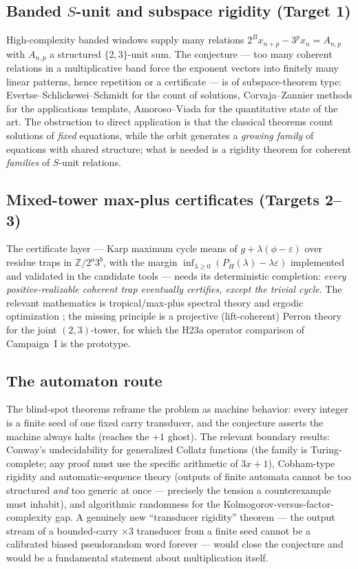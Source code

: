 \documentclass[11pt]{article}
\newcommand{\Z}{\mathbb Z}
\begin{document}
\subsection{Banded $S$-unit and subspace rigidity (Target 1)}
High-complexity banded windows supply many relations
$2^{B}x_{n+p}-3^px_n=A_{n,p}$ with $A_{n,p}$ a structured
$\{2,3\}$-unit sum.  The conjecture --- too many coherent relations in
a multiplicative band force the exponent vectors into finitely many
linear patterns, hence repetition or a certificate --- is of
subspace-theorem type: Evertse--Schlickewei--Schmidt \cite{ESS} for
the count of solutions, Corvaja--Zannier methods \cite{CZ} for the
applications template, Amoroso--Viada \cite{AV} for the quantitative
state of the art.  The obstruction to direct application is that the
classical theorems count solutions of \emph{fixed} equations, while
the orbit generates a \emph{growing family} of equations with shared
structure; what is needed is a rigidity theorem for coherent
\emph{families} of $S$-unit relations.

\subsection{Mixed-tower max-plus certificates (Targets 2--3)}
The certificate layer --- Karp maximum cycle means of
$g+\lambda(\phi-\varepsilon)$ over residue traps in $\Z/2^a3^b$, with
the margin $\inf_{\lambda\ge0}(P_H(\lambda)-\lambda\varepsilon)$
implemented and validated in the candidate tools --- needs its
deterministic completion: \emph{every positive-realizable coherent
trap eventually certifies, except the trivial cycle}.  The relevant
mathematics is tropical/max-plus spectral theory \cite{Butkovic} and
ergodic optimization \cite{Jenkinson}; the missing principle is a
projective (lift-coherent) Perron theory for the joint
$(2,3)$-tower, for which the H23a operator comparison of Campaign~I
is the prototype.

\subsection{The automaton route}
The blind-spot theorems reframe the problem as machine behavior:
every integer is a finite seed of one fixed carry transducer, and the
conjecture asserts the machine always halts (reaches the $+1$ ghost).
The relevant boundary results: Conway's undecidability for
generalized Collatz functions \cite{Conway,KurtzSimon} (the family is
Turing-complete; any proof must use the specific arithmetic of
$3x+1$), Cobham-type rigidity and automatic-sequence theory
\cite{Allouche,AdamczewskiBugeaud} (outputs of finite automata cannot
be too structured \emph{and} too generic at once --- precisely the
tension a counterexample must inhabit), and algorithmic randomness
\cite{DowneyHirschfeldt} for the Kolmogorov-versus-factor-complexity
gap.  A genuinely new ``transducer rigidity'' theorem --- the output
stream of a bounded-carry $\times3$ transducer from a finite seed
cannot be a calibrated biased pseudorandom word forever --- would
close the conjecture and would be a fundamental statement about
multiplication itself.
\end{document}

